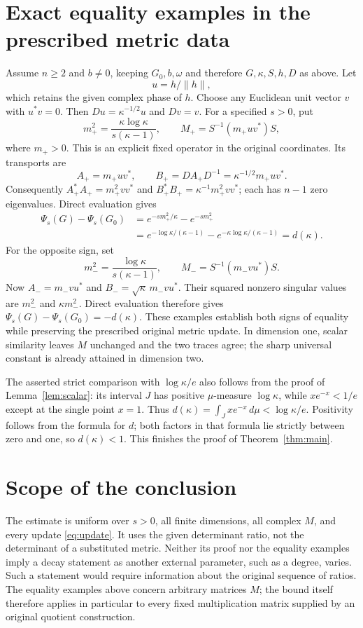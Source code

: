 \documentclass[11pt]{article}
\begin{document}
\section{Exact equality examples in the prescribed metric data}
Assume $n\geq2$ and $b\ne0$, keeping $G_0,b,\omega$ and therefore
$G,\kappa,S,h,D$ as above. Let
\[
 u=h/\|h\|,
\]
which retains the given complex phase of $h$. Choose any Euclidean
unit vector $v$ with $u^*v=0$. Then
$Du=\kappa^{-1/2}u$ and $Dv=v$.
For a specified $s>0$, put
\begin{equation}\label{eq:positive-example}
 m_+^2=\frac{\kappa\log\kappa}{s(\kappa-1)},\qquad
 M_+=S^{-1}(m_+uv^*)S,
\end{equation}
where $m_+>0$. This is an explicit fixed operator in the original
coordinates. Its transports are
\[
 A_+=m_+uv^*,\qquad B_+=D A_+ D^{-1}
             =\kappa^{-1/2}m_+uv^*.
\]
Consequently $A_+^*A_+=m_+^2vv^*$ and
$B_+^*B_+=\kappa^{-1}m_+^2vv^*$; each has $n-1$ zero
eigenvalues. Direct evaluation gives
\begin{align*}
 \Psi_s(G)-\Psi_s(G_0)
 &= e^{-sm_+^2/\kappa}-e^{-sm_+^2}\\
 &=e^{-\log\kappa/(\kappa-1)}
     -e^{-\kappa\log\kappa/(\kappa-1)}
 =d(\kappa).
\end{align*}
For the opposite sign, set
\begin{equation}\label{eq:negative-example}
 m_-^2=\frac{\log\kappa}{s(\kappa-1)},\qquad
 M_-=S^{-1}(m_-vu^*)S.
\end{equation}
Now $A_-=m_-vu^*$ and $B_-=\sqrt\kappa\,m_-vu^*$.
Their squared nonzero singular values are $m_-^2$ and
$\kappa m_-^2$. Direct evaluation therefore gives
$\Psi_s(G)-\Psi_s(G_0)=-d(\kappa)$.
These examples establish both signs of equality while preserving
the prescribed original metric update. In dimension one, scalar
similarity leaves $M$ unchanged and the two traces agree; the sharp
universal constant is already attained in dimension two.

The asserted strict comparison with $\log\kappa/e$ also follows
from the proof of Lemma~\ref{lem:scalar}: its interval $J$ has
positive $\mu$-measure $\log\kappa$, while $xe^{-x}<1/e$ except
at the single point $x=1$. Thus
$d(\kappa)=\int_J xe^{-x}\,d\mu<\log\kappa/e$.
Positivity follows from the formula for $d$; both factors in that
formula lie strictly between zero and one, so $d(\kappa)<1$.
This finishes the proof of Theorem~\ref{thm:main}.

\section{Scope of the conclusion}
The estimate is uniform over $s>0$, all finite dimensions, all
complex $M$, and every update \eqref{eq:update}. It uses the given
determinant ratio, not the determinant of a substituted metric.
Neither its proof nor the equality examples imply a decay statement
as another external parameter, such as a degree, varies. Such a
statement would require information about the original sequence of
ratios. The equality examples above concern arbitrary matrices $M$;
the bound itself therefore applies in particular to every fixed
multiplication matrix supplied by an original quotient construction.
\end{document}

